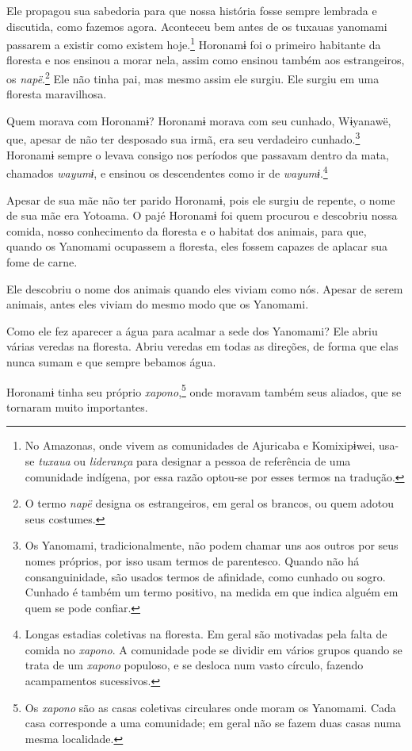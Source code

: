 Ele propagou sua sabedoria para que nossa história fosse sempre lembrada
e discutida, como fazemos agora. Aconteceu bem antes de os tuxauas
yanomami passarem a existir como existem
hoje.\footnote{No Amazonas, onde vivem as comunidades de Ajuricaba e Komixipɨwei,
usa-se \textit{tuxaua} ou \textit{liderança} para designar a pessoa de referência
de uma comunidade indígena, por essa razão optou-se por esses termos na
tradução.}  Horonamɨ foi o primeiro habitante da floresta e
nos ensinou a morar nela, assim como ensinou também aos estrangeiros,
os \textit{napë}.\footnote{O termo \textit{napë} designa os estrangeiros, em geral os brancos, ou quem adotou seus costumes.} Ele não tinha pai, mas mesmo assim
ele surgiu. Ele surgiu em uma floresta maravilhosa. 

Quem morava com Horonamɨ? Horonamɨ morava com seu cunhado, Wɨyanawë,
que, apesar de não ter desposado sua irmã, era seu verdadeiro
cunhado.\footnote{Os Yanomami, tradicionalmente, não podem chamar uns aos outros por seus nomes próprios, por isso usam termos de parentesco. Quando não há
consanguinidade, são usados termos de afinidade, como cunhado ou sogro.
Cunhado é também um termo positivo, na medida em que indica alguém em
quem se pode confiar.} Horonamɨ sempre o levava consigo nos
períodos que passavam dentro da mata, chamados \textit{wayumɨ}, e ensinou
os descendentes como ir de \textit{wayumɨ}.\footnote{Longas estadias coletivas na floresta. Em geral são motivadas pela falta de comida no \textit{xapono}. A comunidade pode se dividir em vários grupos quando se trata de um \textit{xapono} populoso, e se desloca num vasto círculo, fazendo acampamentos sucessivos.}

Apesar de sua mãe não ter parido Horonamɨ, pois ele surgiu de repente, o
nome de sua mãe era Yotoama. O pajé Horonamɨ foi quem procurou e
descobriu nossa comida, nosso conhecimento da floresta e o habitat dos
animais, para que, quando os Yanomami ocupassem a floresta, eles fossem
capazes de aplacar sua fome de carne. 

Ele descobriu o nome dos animais quando eles viviam como nós. Apesar de
serem animais, antes eles viviam do mesmo modo que os Yanomami. 

Como ele fez aparecer a água para acalmar a sede dos Yanomami? Ele abriu
várias veredas na floresta. Abriu veredas em todas as direções, de forma
que elas nunca sumam e que sempre bebamos água. 

Horonamɨ tinha seu próprio \textit{xapono},\footnote{Os \textit{xapono} são as casas 
coletivas circulares onde moram os Yanomami. Cada casa corresponde 
a uma comunidade; em geral não se fazem duas casas numa mesma localidade.} onde moravam
também seus aliados, que se tornaram muito importantes. 

